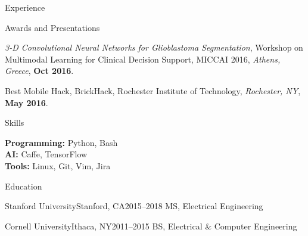 \documentclass{resume}
\begin{document}
\begin{rSection}{Experience}

\end{rSection}

\begin{rSection}{Awards and Presentations}

    {\em 3-D Convolutional Neural Networks for Glioblastoma Segmentation}, Workshop on Multimodal Learning for Clinical Decision Support, MICCAI 2016, {\em Athens, Greece}, {\bf Oct 2016}.

    Best Mobile Hack, BrickHack, Rochester Institute of Technology, {\em Rochester, NY}, {\bf May 2016}.

\end{rSection}

\begin{rSection}{Skills}

    {\bf Programming:} Python, Bash\\
    {\bf AI:} Caffe, TensorFlow\\
    {\bf Tools:} Linux, Git, Vim, Jira

\end{rSection}

\begin{rSection}{Education}

    \begin{rEducation}{Stanford University}{Stanford, CA}{2015--2018}
        MS, Electrical Engineering
    \end{rEducation}

    \begin{rEducation}{Cornell University}{Ithaca, NY}{2011--2015}
        BS, Electrical \& Computer Engineering
    \end{rEducation}

\end{rSection}
\end{document}
